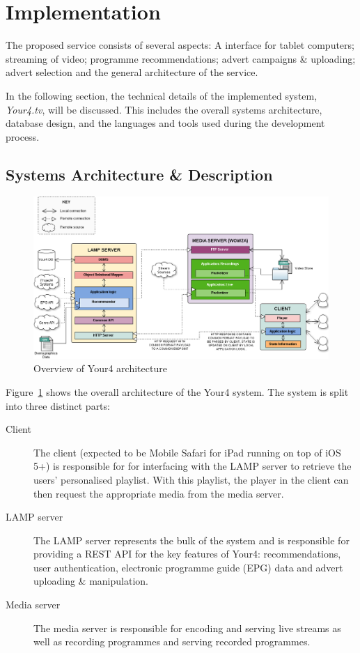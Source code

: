 \section{Implementation}

The proposed service consists of several aspects: A interface for tablet computers; streaming of video; programme recommendations; advert campaigns \& uploading; advert selection and the general architecture of the service.

In the following section, the technical details of the implemented system, \textit{Your4.tv}, will be discussed. This includes the overall systems architecture, database design, and the languages and tools used during the development process.

\subsection{Systems Architecture \& Description}

\begin{figure}[H]
	\centering
	\includegraphics[width=\textwidth]{images/your4-architecture.png}
	\caption{Overview of Your4 architecture}
	\label{fig:your4-architecture}
\end{figure}

Figure~\ref{fig:your4-architecture} shows the overall architecture of the Your4 system. The system is split into three distinct parts:

\begin{description}
	\item[Client] The client (expected to be Mobile Safari for iPad running on top of iOS 5+) is responsible for for interfacing with the LAMP server to retrieve the users' personalised playlist. With this playlist, the player in the client can then request the appropriate media from the media server.
	\item[LAMP server] The LAMP server represents the bulk of the system and is responsible for providing a REST API for the key features of Your4: recommendations, user authentication, electronic programme guide (EPG) data and advert uploading \& manipulation.
	\item[Media server] The media server is responsible for encoding and serving live streams as well as recording programmes and serving recorded programmes.
\end{description}

